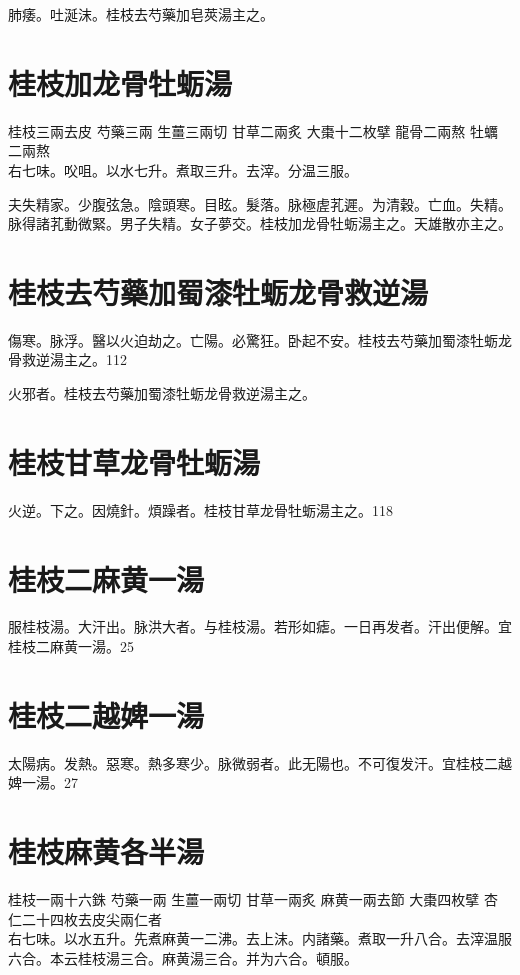 \documentclass[b5paper,twoside,zihao=-4,UTF8]{ctexbook}
\begin{document}
肺痿。吐涎沫。桂枝去芍藥加皂莢湯主之。

\section{桂枝加龙骨牡蛎湯}

桂枝{\scriptsize 三兩去皮} 芍藥{\scriptsize 三兩} 生薑{\scriptsize 三兩切} 甘草{\scriptsize 二兩炙} 大棗{\scriptsize 十二枚擘} 龍骨{\scriptsize 二兩熬} 牡蠣{\scriptsize 二兩熬}\\
右七味。㕮咀。以水七升。煮取三升。去滓。分温三服。

夫失精家。少腹弦急。陰頭寒。目眩。髮落。脉極虗芤遲。为清穀。亡血。失精。脉得諸芤動微緊。男子失精。女子夢交。桂枝加龙骨牡蛎湯主之。天雄散亦主之。

\section{桂枝去芍藥加蜀漆牡蛎龙骨救逆湯}

傷寒。脉浮。醫以火迫劫之。亡陽。{必}驚狂。卧起不安。桂枝去芍藥加蜀漆牡蛎龙骨救逆湯主之。112

火邪者。桂枝去芍藥加蜀漆牡蛎龙骨救逆湯主之。

\section{桂枝甘草龙骨牡蛎湯}

火逆。下之。因燒針。煩躁者。桂枝甘草龙骨牡蛎湯主之。118

\section{桂枝二麻黄一湯}

服桂枝湯。大汗出。脉洪大者。与桂枝湯。若形如瘧。一日再发者。汗出便解。宜桂枝二麻黄一湯。25

\section{桂枝二越婢一湯}

太陽病。发熱。惡寒。熱多寒少。脉微弱者。此无陽也。不可{復}发汗。{宜桂枝二越婢一湯。}27

\section{桂枝麻黄各半湯}

桂枝{\scriptsize 一兩十六銖} 芍藥{\scriptsize 一兩} 生薑{\scriptsize 一兩切} 甘草{\scriptsize 一兩炙} 麻黄{\scriptsize 一兩去節} 大棗{\scriptsize 四枚擘} 杏仁{\scriptsize 二十四枚去皮尖兩仁者}\\
右七味。以水五升。先煮麻黄一二沸。去上沫。内諸藥。煮取一升八合。去滓温服六合。本云桂枝湯三合。麻黄湯三合。并为六合。頓服。
\end{document}

